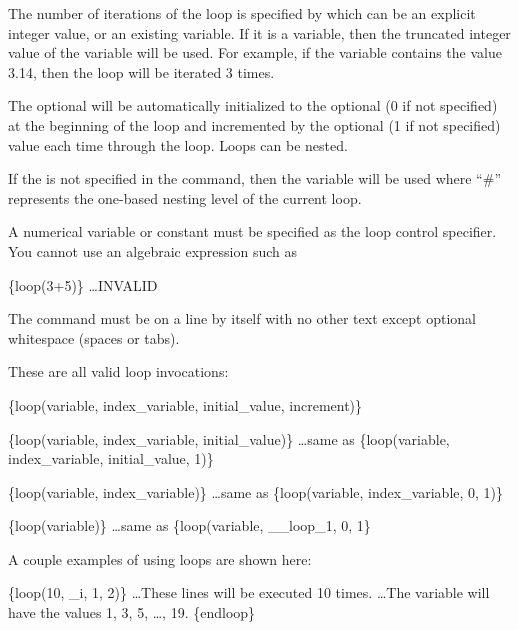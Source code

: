 The number of iterations of the loop is specified by  which can be an explicit integer value, or an existing variable.  If it is a variable, then the truncated integer value of the variable will be used.  For example, if the variable contains the value 3.14, then the loop will be iterated 3 times.

The optional  will be automatically initialized
to the optional  (0 if not specified) at the
beginning of the loop and incremented by the optional 
(1 if not specified) value each time through the loop.  Loops can be
nested.

If the  is not specified in the 
command, then the variable  will be used where ``\#''
represents the one-based nesting level of the current loop.

A numerical variable or constant must be specified as the loop control
specifier. You cannot use an algebraic expression such as

\begin{apinp}
\{loop(3+5)\}  \ldots INVALID
\end{apinp}

The  command must be on a line by itself with no other text except optional whitespace (spaces or tabs).

These are all valid loop invocations:
\begin{apinp}
\{loop(variable, index\_variable, initial\_value, increment)\}
\end{apinp}

\begin{apinp}
\{loop(variable, index\_variable, initial\_value)\}
\ldots same as \{loop(variable, index\_variable, initial\_value, 1)\}
\end{apinp}

\begin{apinp}
\{loop(variable, index\_variable)\}
\ldots same as \{loop(variable, index\_variable, 0, 1)\}
\end{apinp}

\begin{apinp}
\{loop(variable)\}
\ldots same as \{loop(variable, \_\_loop\_1, 0, 1\}
\end{apinp}

A couple examples of using loops are shown here:
\begin{apinp}
\{loop(10, \_i, 1, 2)\}
\ldots These lines will be executed 10 times.
\ldots The variable  will have the values 1, 3, 5, \ldots, 19. 
\{endloop\}
\end{apinp}

